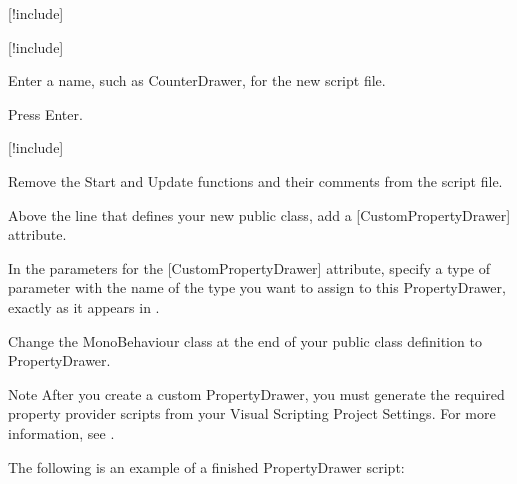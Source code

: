 \begin{DoxyEnumerate}
\item \mbox{[}!include\mbox{]}
\item \mbox{[}!include\mbox{]}
\item Enter a name, such as {\ttfamily Counter\+Drawer}, for the new script file.
\item Press Enter.
\item \mbox{[}!include\mbox{]}
\item Remove the {\ttfamily Start} and {\ttfamily Update} functions and their comments from the script file.
\item Above the line that defines your new {\ttfamily public class}, add a {\ttfamily \mbox{[}Custom\+Property\+Drawer\mbox{]}} attribute.
\item In the parameters for the {\ttfamily \mbox{[}Custom\+Property\+Drawer\mbox{]}} attribute, specify a {\ttfamily type of} parameter with the name of the type you want to assign to this Property\+Drawer, exactly as it appears in .
\item Change the {\ttfamily Mono\+Behaviour} class at the end of your {\ttfamily public class} definition to {\ttfamily Property\+Drawer}.
\end{DoxyEnumerate}

\begin{DoxyNote}{Note}
After you create a custom Property\+Drawer, you must generate the required property provider scripts from your Visual Scripting Project Settings. For more information, see .
\end{DoxyNote}
The following is an example of a finished Property\+Drawer script\+:


